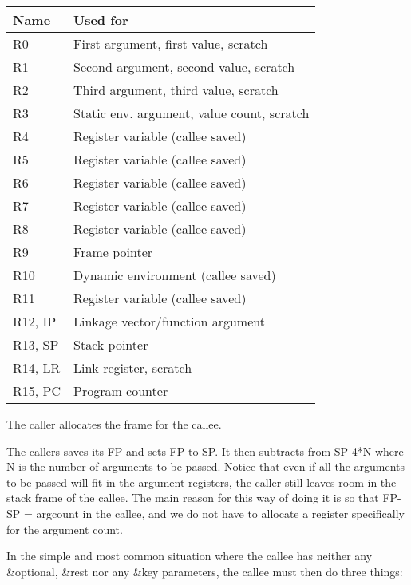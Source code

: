 \begin{tabular}{|l|l|}
\hline
Name & Used for\\
\hline
\hline
R0 & First argument, first value, scratch\\
R1 & Second argument, second value, scratch \\
R2 & Third argument, third value, scratch \\
R3 & Static env. argument, value count, scratch \\
R4 & Register variable (callee saved) \\
R5 & Register variable (callee saved) \\
R6 & Register variable (callee saved) \\
R7 & Register variable (callee saved) \\
R8 & Register variable (callee saved) \\
R9 & Frame pointer\\
R10 & Dynamic environment (callee saved) \\
R11 & Register variable (callee saved)\\
R12, IP & Linkage vector/function argument\\
R13, SP & Stack pointer \\
R14, LR & Link register, scratch \\
R15, PC & Program counter \\
\hline
\end{tabular}

The caller allocates the frame for the callee. 

The callers saves its FP and sets FP to SP.  It then subtracts from SP
4*N where N is the number of arguments to be passed.  Notice that even
if all the arguments to be passed will fit in the argument registers,
the caller still leaves room in the stack frame of the callee.  The
main reason for this way of doing it is so that FP-SP = argcount in
the callee, and we do not have to allocate a register specifically for
the argument count.

In the simple and most common situation where the callee has neither
any \&optional, \&rest nor any \&key parameters, the callee must then
do three things:

